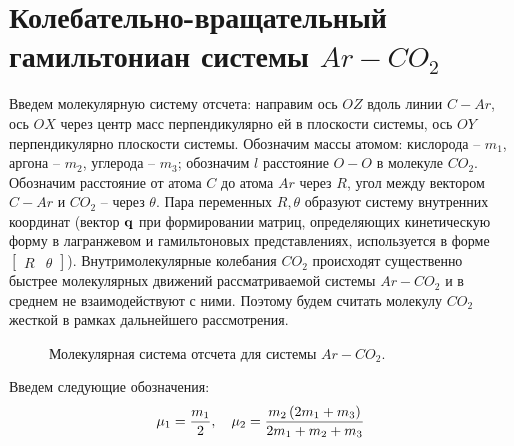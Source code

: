 \section{Колебательно-вращательный гамильтониан системы $Ar-CO_2$}

Введем молекулярную систему отсчета: направим ось $OZ$ вдоль линии $C-Ar$, ось $OX$ через центр масс перпендикулярно ей в плоскости системы, ось $OY$ перпендикулярно плоскости системы. Обозначим массы атомом: кислорода -- $m_1$, аргона -- $m_2$, углерода -- $m_3$; обозначим $l$ расстояние $O-O$ в молекуле $CO_2$. Обозначим расстояние от атома $C$ до атома $Ar$ через $R$, угол между вектором $C-Ar$ и $CO_2$ -- через $\theta$. Пара переменных $R, \theta$ образуют систему внутренних координат (вектор $\mathbf{q}$ при формировании матриц, определяющих кинетическую форму в лагранжевом и гамильтоновых представлениях, используется в форме $\begin{bmatrix} R & \theta \end{bmatrix}$). Внутримолекулярные колебания $CO_2$ происходят существенно быстрее молекулярных движений рассматриваемой системы $Ar-CO_2$ и в среднем не взаимодействуют с ними. Поэтому будем считать молекулу $CO_2$ жесткой в рамках дальнейшего рассмотрения.
\begin{figure}[h]
\centering
{}
\caption{Молекулярная система отсчета для системы $Ar-CO_2$.}
\end{figure}

Введем следующие обозначения:
\vverh
\begin{gather}
	\mu_1 = \frac{m_1}{2}, \quad 
	\mu_2 = \frac{m_2 \left( 2 m_1 + m_3 \right)}{2 m_1 + m_2 + m_3} \notag
\end{gather}

